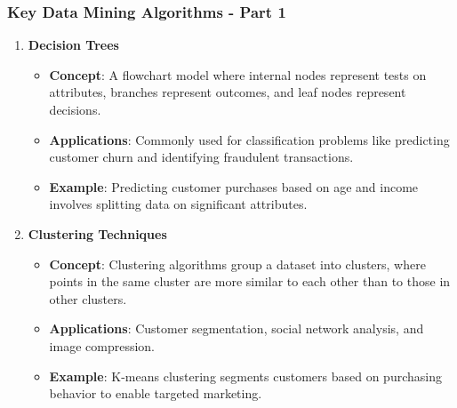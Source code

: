 \documentclass[aspectratio=169]{beamer}
\begin{document}
\begin{frame}[fragile]
    \frametitle{Key Data Mining Algorithms - Part 1}
    
    \begin{enumerate}
        \item \textbf{Decision Trees}
        \begin{itemize}
            \item \textbf{Concept}: A flowchart model where internal nodes represent tests on attributes, branches represent outcomes, and leaf nodes represent decisions.
            \item \textbf{Applications}: Commonly used for classification problems like predicting customer churn and identifying fraudulent transactions.
            \item \textbf{Example}: Predicting customer purchases based on age and income involves splitting data on significant attributes.
        \end{itemize}
        
        \item \textbf{Clustering Techniques}
        \begin{itemize}
            \item \textbf{Concept}: Clustering algorithms group a dataset into clusters, where points in the same cluster are more similar to each other than to those in other clusters.
            \item \textbf{Applications}: Customer segmentation, social network analysis, and image compression.
            \item \textbf{Example}: K-means clustering segments customers based on purchasing behavior to enable targeted marketing.
        \end{itemize}
    \end{enumerate}
\end{frame}
\end{document}
